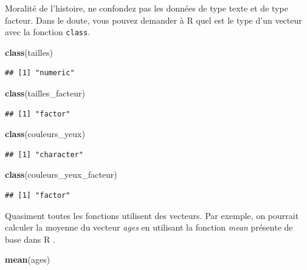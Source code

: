 \documentclass[
  11pt,
  french,
]{book}
\makeatletter
\newenvironment{Shaded}{\begin{snugshade}}{\end{snugshade}}
\newcommand{\KeywordTok}[1]{\textcolor[rgb]{0.13,0.29,0.53}{\textbf{#1}}}
\newcommand{\NormalTok}[1]{#1}
\newenvironment{kframe}{%
\medskip{}
\setlength{\fboxsep}{.8em}
 \def\at@end@of@kframe{}%
 \ifinner\ifhmode%
  \def\at@end@of@kframe{\end{minipage}}%
  \begin{minipage}{\columnwidth}%
 \fi\fi%
 \def\FrameCommand##1{\hskip\@totalleftmargin \hskip-\fboxsep
 \colorbox{shadecolor}{##1}\hskip-\fboxsep
     \hskip-\linewidth \hskip-\@totalleftmargin \hskip\columnwidth}%
 \MakeFramed {\advance\hsize-\width
   \@totalleftmargin\z@ \linewidth\hsize
   \@setminipage}}%
 {\par\unskip\endMakeFramed%
 \at@end@of@kframe}
\newenvironment{kframev}{%
\medskip{}
\setlength{\fboxsep}{.8em}
 \def\at@end@of@kframev{}%
 \ifinner\ifhmode%
  \def\at@end@of@kframev{\end{minipage}}%
  \begin{minipage}{\columnwidth}%
 \fi\fi%
 \def\FrameCommand##1{\hskip\@totalleftmargin \hskip-\fboxsep
 \colorbox{shadebluecolor}{##1}\hskip-\fboxsep
     \hskip-\linewidth \hskip-\@totalleftmargin \hskip\columnwidth}%
 \MakeFramed {\advance\hsize-\width
   \@totalleftmargin\z@ \linewidth\hsize
   \@setminipage}}%
 {\par\unskip\endMakeFramed%
 \at@end@of@kframev}
\renewenvironment{Shaded}{\begin{kframe}}{\end{kframe}}
\newenvironment{rmdblock}[1]
  {
  \begin{itemize}
  \renewcommand{\labelitemi}{
    \raisebox{-.7\height}[0pt][0pt]{
      {\setkeys{Gin}{width=3em,keepaspectratio}\texttt{[image: images/\#1]}}
    }
  }
  \setlength{\fboxsep}{1em}
  \begin{kframev}
  \small
  \item
  }
  {
  \end{kframev}
  \end{itemize}
  }
\newenvironment{bloc_attention}
  {\begin{rmdblock}{attention}}
  {\end{rmdblock}}
\makeatother
\begin{document}
\begin{bloc_attention}
Moralité de l'histoire, ne confondez pas les données de type texte et de type facteur. Dans le doute, vous pouvez demander à R quel est le type d'un vecteur avec la fonction \texttt{class}.

\begin{Shaded}
\begin{Highlighting}[]
\KeywordTok{class}\NormalTok{(tailles)}
\end{Highlighting}
\end{Shaded}

\begin{verbatim}
## [1] "numeric"
\end{verbatim}

\begin{Shaded}
\begin{Highlighting}[]
\KeywordTok{class}\NormalTok{(tailles_facteur)}
\end{Highlighting}
\end{Shaded}

\begin{verbatim}
## [1] "factor"
\end{verbatim}

\begin{Shaded}
\begin{Highlighting}[]
\KeywordTok{class}\NormalTok{(couleurs_yeux)}
\end{Highlighting}
\end{Shaded}

\begin{verbatim}
## [1] "character"
\end{verbatim}

\begin{Shaded}
\begin{Highlighting}[]
\KeywordTok{class}\NormalTok{(couleurs_yeux_facteur)}
\end{Highlighting}
\end{Shaded}

\begin{verbatim}
## [1] "factor"
\end{verbatim}

\end{bloc_attention}

Quasiment toutes les fonctions utilisent des vecteurs. Par exemple, on pourrait calculer la moyenne du vecteur \emph{ages} en utilisant la fonction \emph{mean} présente de base dans R .

\begin{Shaded}
\begin{Highlighting}[]
\KeywordTok{mean}\NormalTok{(ages)}
\end{Highlighting}
\end{Shaded}
\end{document}
